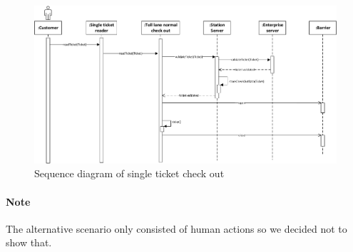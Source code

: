 \begin{figure}[H]
\centerline{\includegraphics[width=1.4\columnwidth]{img/sequence_diagrams/sequence_diagram_single_ticket_check_out}}
\caption{Sequence diagram of single ticket check out}
\label{fig:seq_check_out_single_ticket}
\end{figure}

\paragraph*{Note} The alternative scenario only consisted of human actions so we decided not to show that.

